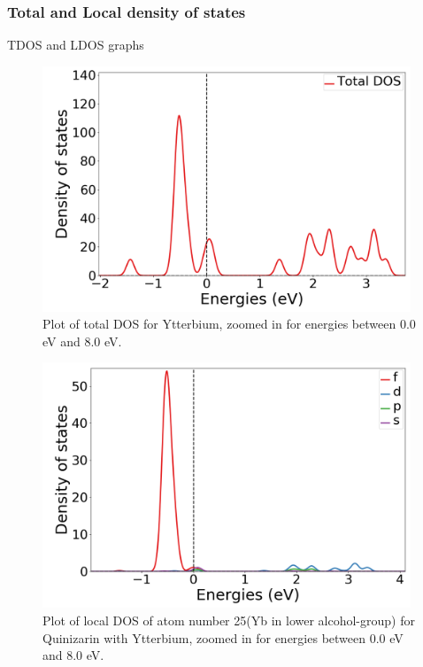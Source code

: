 \documentclass{article}
\begin{document}
    \subsubsection{Total and Local density of states}

      TDOS and LDOS graphs


      \begin{figure}[H]
        \centering
        \includegraphics[width = 11cm]{../fig/Yb_TDOS_2.png}
        \caption{Plot of total DOS for Ytterbium, zoomed in for energies between 0.0 eV and 8.0 eV. }
        \label{fig:Yb_TDOS_2.png}
      \end{figure}

      \begin{figure}[H]
          \centering
          \includegraphics[width = 11cm]{../fig/Yb_LDOS25_2.png}
          \caption{Plot of local DOS of atom number 25(Yb in lower alcohol-group) for Quinizarin with Ytterbium, zoomed in for energies between 0.0 eV and 8.0 eV. }
          \label{fig:Yb_LDOS25_2.png}
      \end{figure}
\end{document}
